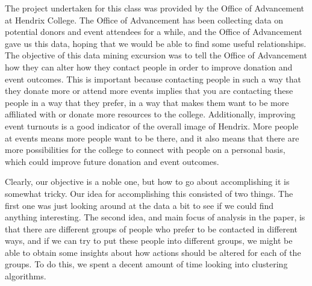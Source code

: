 \documentclass[../main.tex]{subfiles}
\begin{document}
The project undertaken for this class was provided by the Office of
Advancement at Hendrix College. The Office of Advancement has been
collecting data on potential donors and event attendees for a while, and the
Office of Advancement gave us this data, hoping that we would be able to
find some useful relationships. The objective of this data mining excursion
was to tell the Office of Advancement how they can alter how they contact
people in order to improve donation and event outcomes. This is important
because contacting people in such a way that they donate more or attend more
events implies that you are contacting these people in a way that they
prefer, in a way that makes them want to be more affiliated with or donate
more resources to the college. Additionally, improving event turnouts is a
good indicator of the overall image of Hendrix. More people at events
means more people want to be there, and it also means that there are more 
possibilities for the college to connect with people on a personal basis,
which could improve future donation and event outcomes.

Clearly, our objective is a noble one, but how to go about accomplishing it is somewhat
tricky. Our idea for accomplishing this consisted of two things. The first
one was just looking around at the data a bit to see if we could find
anything interesting. The second idea, and main focus of analysis in the
paper, is that there are different groups of people who prefer to be
contacted in different ways, and if we can try to put these people into
different groups, we might be able to obtain some insights about how actions
should be altered for each of the groups. To do this, we spent a decent
amount of time looking into clustering algorithms.
\end{document}
